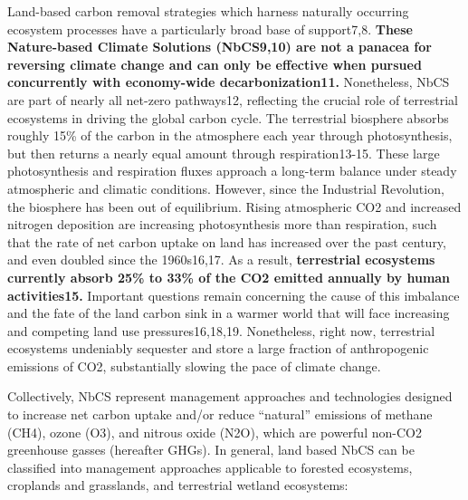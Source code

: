 \documentclass[
  letterpaper,
  DIV=11,
  numbers=noendperiod]{scrreprt}
\begin{document}
Land-based carbon removal strategies which harness naturally occurring
ecosystem processes have a particularly broad base of support7,8.
\textbf{These Nature-based Climate Solutions (NbCS9,10) are not a
panacea for reversing climate change and can only be effective when
pursued concurrently with economy-wide decarbonization11.} Nonetheless,
NbCS are part of nearly all net-zero pathways12, reflecting the crucial
role of terrestrial ecosystems in driving the global carbon cycle. The
terrestrial biosphere absorbs roughly 15\% of the carbon in the
atmosphere each year through photosynthesis, but then returns a nearly
equal amount through respiration13-15. These large photosynthesis and
respiration fluxes approach a long-term balance under steady atmospheric
and climatic conditions. However, since the Industrial Revolution, the
biosphere has been out of equilibrium. Rising atmospheric CO2 and
increased nitrogen deposition are increasing photosynthesis more than
respiration, such that the rate of net carbon uptake on land has
increased over the past century, and even doubled since the 1960s16,17.
As a result, \textbf{terrestrial ecosystems currently absorb 25\% to
33\% of the CO2 emitted annually by human activities15.} Important
questions remain concerning the cause of this imbalance and the fate of
the land carbon sink in a warmer world that will face increasing and
competing land use pressures16,18,19. Nonetheless, right now,
terrestrial ecosystems undeniably sequester and store a large fraction
of anthropogenic emissions of CO2, substantially slowing the pace of
climate change.

Collectively, NbCS represent management approaches and technologies
designed to increase net carbon uptake and/or reduce ``natural''
emissions of methane (CH4), ozone (O3), and nitrous oxide (N2O), which
are powerful non-CO2 greenhouse gasses (hereafter GHGs). In general,
land based NbCS can be classified into management approaches applicable
to forested ecosystems, croplands and grasslands, and terrestrial
wetland ecosystems:
\end{document}

